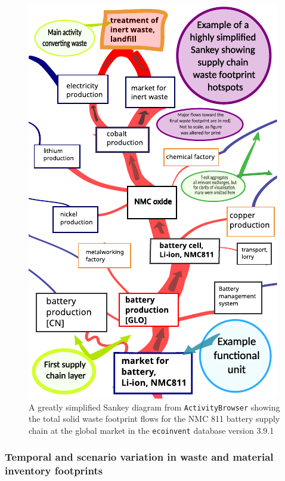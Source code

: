 \documentclass[a4paper,fleqn]{cas-dc}
\renewcommand{\texttt}[1]{{\ttfamily\small\nolinkurl{#1}}}
\begin{document}
\begin{figure}
	\centering
	\includegraphics[width=0.9\columnwidth]{figures/T-reX_NMC811_WasteTotalSolid.pdf}
	\caption{A greatly simplified Sankey diagram from \texttt{ActivityBrowser} showing the total solid waste footprint flows for the NMC 811 battery supply chain at the global market in the \texttt{ecoinvent} database version 3.9.1}\label{fig:sankey_waste}
\end{figure}

\subsubsection{Temporal and scenario variation in waste and material inventory footprints}
\end{document}
